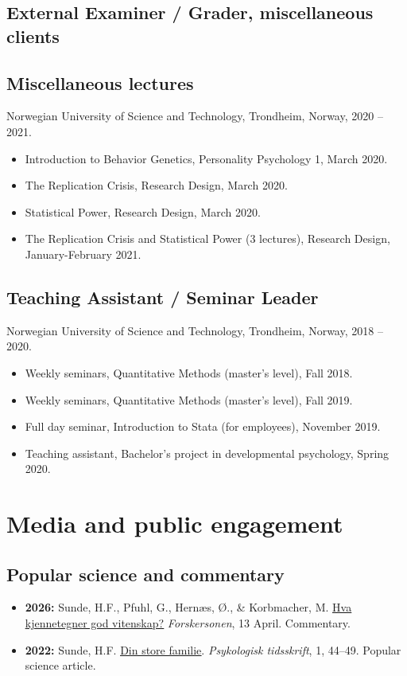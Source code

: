 \documentclass[10pt,a4paper]{article}
\let\cvhref\href
\renewcommand{\href}[2]{\cvhref{#1}{\underline{#2}}}%
\begin{document}
\subsection*{External Examiner / Grader, miscellaneous clients}

\subsection*{Miscellaneous lectures}
Norwegian University of Science and Technology, Trondheim, Norway, 2020 -- 2021.
\begin{itemize}
\item Introduction to Behavior Genetics, Personality Psychology 1, March 2020.
\item The Replication Crisis, Research Design, March 2020.
\item Statistical Power, Research Design, March 2020.
\item The Replication Crisis and Statistical Power (3 lectures), Research Design, January-February 2021.
\end{itemize}

\subsection*{Teaching Assistant / Seminar Leader}
Norwegian University of Science and Technology, Trondheim, Norway, 2018 -- 2020.
\begin{itemize}
\item Weekly seminars, Quantitative Methods (master's level), Fall 2018.
\item Weekly seminars, Quantitative Methods (master's level), Fall 2019.
\item Full day seminar, Introduction to Stata (for employees), November 2019.
\item Teaching assistant, Bachelor's project in developmental psychology, Spring 2020.
\end{itemize}

\section*{Media and public engagement}
\subsection*{Popular science and commentary}
\begin{itemize}
\item \textbf{2026:} Sunde, H.F., Pfuhl, G., Hernæs, Ø., \& Korbmacher, M. \href{https://www.forskersonen.no/forskning-kronikk-meninger/hva-kjennetegner-god-vitenskap/2647068}{Hva kjennetegner god vitenskap?} \textit{Forskersonen}, 13 April. Commentary.
\item \textbf{2022:} Sunde, H.F. \href{https://psykologisktidsskrift.no/din-store-familie/}{Din store familie}. \textit{Psykologisk tidsskrift}, 1, 44--49. Popular science article.
\end{itemize}
\end{document}
